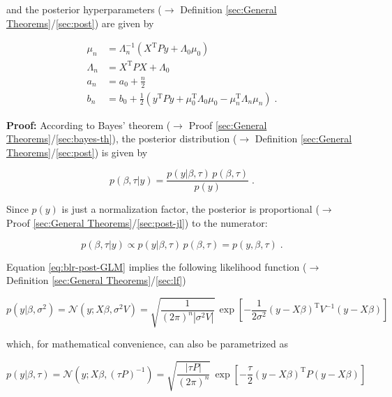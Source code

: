 \documentclass[a4paper,12pt,twoside]{book}
\begin{document}
and the posterior hyperparameters ($\rightarrow$ Definition \ref{sec:General Theorems}/\ref{sec:post}) are given by

\begin{equation} \label{eq:blr-post-GLM-NG-post-par}
\begin{split}
\mu_n &= \Lambda_n^{-1} (X^\mathrm{T} P y + \Lambda_0 \mu_0) \\
\Lambda_n &= X^\mathrm{T} P X + \Lambda_0 \\
a_n &= a_0 + \frac{n}{2} \\
b_n &= b_0 + \frac{1}{2} (y^\mathrm{T} P y + \mu_0^\mathrm{T} \Lambda_0 \mu_0 - \mu_n^\mathrm{T} \Lambda_n \mu_n) \; .
\end{split}
\end{equation}


\vspace{1em}
\textbf{Proof:} According to Bayes' theorem ($\rightarrow$ Proof \ref{sec:General Theorems}/\ref{sec:bayes-th}), the posterior distribution ($\rightarrow$ Definition \ref{sec:General Theorems}/\ref{sec:post}) is given by

\begin{equation} \label{eq:blr-post-GLM-NG-BT}
p(\beta,\tau|y) = \frac{p(y|\beta,\tau) \, p(\beta,\tau)}{p(y)} \; .
\end{equation}

Since $p(y)$ is just a normalization factor, the posterior is proportional ($\rightarrow$ Proof \ref{sec:General Theorems}/\ref{sec:post-jl}) to the numerator:

\begin{equation} \label{eq:blr-post-GLM-NG-post-JL}
p(\beta,\tau|y) \propto p(y|\beta,\tau) \, p(\beta,\tau) = p(y,\beta,\tau) \; .
\end{equation}

Equation \eqref{eq:blr-post-GLM} implies the following likelihood function ($\rightarrow$ Definition \ref{sec:General Theorems}/\ref{sec:lf})

\begin{equation} \label{eq:blr-post-GLM-LF-class}
p(y|\beta,\sigma^2) = \mathcal{N}(y; X \beta, \sigma^2 V) = \sqrt{\frac{1}{(2 \pi)^n |\sigma^2 V|}} \, \exp\left[ -\frac{1}{2 \sigma^2} (y-X\beta)^\mathrm{T} V^{-1} (y-X\beta) \right]
\end{equation}

which, for mathematical convenience, can also be parametrized as

\begin{equation} \label{eq:blr-post-GLM-LF-Bayes}
p(y|\beta,\tau) = \mathcal{N}(y; X \beta, (\tau P)^{-1}) = \sqrt{\frac{|\tau P|}{(2 \pi)^n}} \, \exp\left[ -\frac{\tau}{2} (y-X\beta)^\mathrm{T} P (y-X\beta) \right]
\end{equation}
\end{document}
